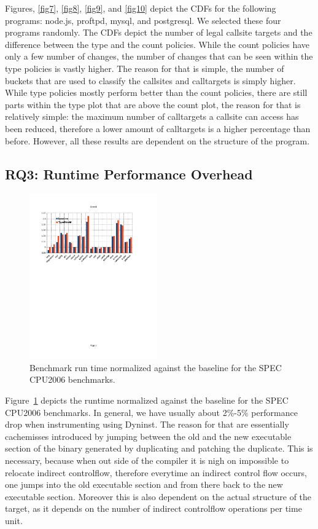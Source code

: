 Figures, \ref{fig7}, \ref{fig8}, \ref{fig9}, and \ref{fig10} depict the CDFs for the following programs: node.js, proftpd, mysql, and postgresql.
We selected these four programs randomly.
The CDFs depict the number of legal callsite targets and the difference between the type and the count policies. 
While the count  policies have only a few number of changes, the number of changes 
that can be seen within the type policies is vastly higher. The reason for that is 
simple, the number of buckets that are used to classify the callsites and calltargets 
is simply higher. While type policies mostly perform better than the count policies, 
there are still parts within the type plot that are above the count plot, the reason 
for that is relatively simple: the maximum number of calltargets a callsite can access 
has been reduced, therefore a lower amount of calltargets is a higher percentage than 
before. However, all these results are dependent on the structure of the program.

\subsection{RQ3: Runtime Performance Overhead}
\label{section:typeshieldoverheadperformance}
\begin{figure}[!h]
    \centering
    \includegraphics[width=0.49\textwidth]{figures/speccpu2006.pdf}
    \caption{Benchmark run time normalized against the baseline for the SPEC CPU2006 benchmarks.}
    \label{fig:awesome_image}
\end{figure}
Figure~\ref{fig:awesome_image} depicts the runtime normalized against the baseline for
the SPEC CPU2006 benchmarks. In general, we have usually about 2\%-5\% performance drop when instrumenting using Dyninst. The reason for that are essentially cachemisses introduced by jumping between the old and the new executable section of the binary generated by duplicating and patching the duplicate. This is necessary, because when out side of the compiler it is nigh on impossible to relocate indirect controlflow, therefore everytime an indirect control flow occurs, one jumps into the old executable section and from there back to the new executable section. Moreover this is also dependent on the actual structure of the target, as it depends on the number of indirect controlflow operations per time unit.

